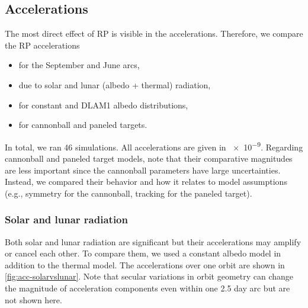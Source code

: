 \subsection{Accelerations}
The most direct effect of \gls{RP} is visible in the accelerations. Therefore, we compare the \gls{RP} accelerations
\begin{itemize}
    \item for the September and June arcs,
    \item due to solar and lunar (albedo + thermal) radiation,
    \item for constant and \gls{DLAM1} albedo distributions,
    \item for cannonball and paneled targets.
\end{itemize}
In total, we ran 46 simulations. All accelerations are given in \qty{e-9}{\acc}. Regarding cannonball and paneled target models, note that their comparative magnitudes are less important since the cannonball parameters have large uncertainties. Instead, we compared their behavior and how it relates to model assumptions (e.g., symmetry for the cannonball, tracking for the paneled target).


\subsubsection{Solar and lunar radiation}
Both solar and lunar radiation are significant but their accelerations may amplify or cancel each other. To compare them, we used a constant albedo model in addition to the thermal model. The accelerations over one orbit are shown in \cref{fig:acc-solarvslunar}. Note that secular variations in orbit geometry can change the magnitude of acceleration components even within one 2.5 day arc but are not shown here.

